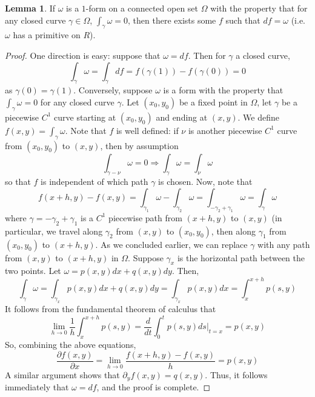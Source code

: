 \documentclass[aps,pra,showpacs,notitlepage,onecolumn,superscriptaddress,nofootinbib]{revtex4-1}
\theoremstyle{definition}
\newtheorem{lemma}{Lemma}[section]
\begin{document}
\begin{lemma}
  If $\omega$ is a $1$-form on a connected open set $\Omega$ with the property that for any closed curve $\gamma \in \Omega$, $\displaystyle\int_{\gamma} \omega = 0$,
  then there exists some $f$ such that $df = \omega$ (i.e. $\omega$ has a primitive on $R$).
\end{lemma}
\begin{proof}
  One direction is easy: suppose that $\omega = df$. Then for $\gamma$ a closed curve,
  \begin{equation}
    \displaystyle\int_{\gamma} \omega = \displaystyle\int_{\gamma} df = f(\gamma(1)) - f(\gamma(0)) = 0
  \end{equation}
  as $\gamma(0) = \gamma(1)$. Conversely, suppose $\omega$ is a form with the property that $\int_{\gamma} \omega = 0$ for any closed
  curve $\gamma$. Let $(x_0, y_0)$ be a fixed point in $\Omega$, let $\gamma$ be a piecewise $C^{1}$ curve starting at $(x_0, y_0)$ and ending at $(x, y)$. We define
  $f(x, y) = \int_{\gamma} \omega$. Note that $f$ is well defined: if $\nu$ is another piecewise $C^1$ curve from $(x_0, y_0)$ to $(x, y)$, then by assumption
  \begin{equation}
    \displaystyle\int_{\gamma - \nu} \omega = 0 \Longrightarrow \displaystyle\int_{\gamma} \omega = \displaystyle\int_{\nu} \omega
  \end{equation}
  so that $f$ is independent of which path $\gamma$ is chosen. Now, note that
  \begin{equation}
    f(x + h, y) - f(x, y) = \displaystyle\int_{\gamma_1} \omega - \displaystyle\int_{\gamma_2} \omega = \displaystyle\int_{-\gamma_2 + \gamma_1} \omega = \displaystyle\int_{\gamma} \omega
  \end{equation}
  where $\gamma = -\gamma_2 + \gamma_1$ is a $C^1$ piecewise path from $(x + h, y)$ to $(x, y)$ (in particular, we travel along $\gamma_2$ from $(x, y)$ to $(x_0, y_0)$,
  then along $\gamma_1$ from $(x_0, y_0)$ to $(x + h, y)$. As we concluded earlier, we can replace $\gamma$ with any path from $(x, y)$ to $(x + h, y)$ in $\Omega$.
  Suppose $\gamma_x$ is the horizontal path between the two points. Let $\omega = p(x, y) dx + q(x, y) dy$. Then,
  \begin{equation}
    \displaystyle\int_{\gamma} \omega = \displaystyle\int_{\gamma_x} p(x, y) dx + q(x, y) dy = \displaystyle\int_{\gamma_x} p(x, y) dx = \displaystyle\int_{x}^{x + h} p(s, y)
  \end{equation}
  It follows from the fundamental theorem of calculus that
  \begin{equation}
    \lim_{h \to 0} \frac{1}{h} \displaystyle\int_{x}^{x + h} p(s, y) = \frac{d}{dt} \displaystyle\int_{0}^{t} p(s, y) ds \biggr\rvert_{t = x} = p(x, y)
  \end{equation}
  So, combining the above equations,
  \begin{equation}
    \frac{\partial f(x, y)}{\partial x} = \lim_{h \to 0}  \frac{f(x + h, y) - f(x, y)}{h} = p(x, y)
  \end{equation}
  A similar argument shows that $\partial_y f(x, y) = q(x, y)$. Thus, it follows immediately that $\omega = df$, and the proof is complete.
\end{proof}
\end{document}
